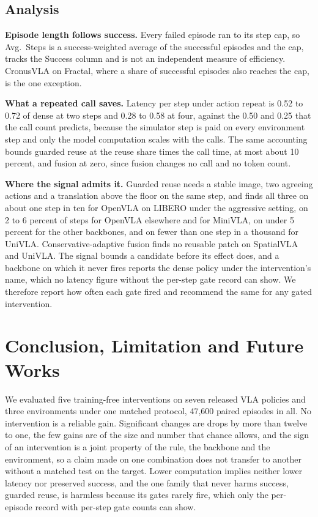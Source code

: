 \documentclass[letterpaper, 10 pt, conference]{ieeeconf}
\begin{document}
\subsection{Analysis}

\textbf{Episode length follows success.} Every failed episode ran to its
step cap, so Avg.\ Steps is a success-weighted average of the successful
episodes and the cap, tracks the Success column and is not an independent
measure of efficiency. CronusVLA on Fractal, where a share of successful
episodes also reaches the cap, is the one exception.

\textbf{What a repeated call saves.} Latency per step under action repeat
is 0.52 to 0.72 of dense at two steps and 0.28 to 0.58 at four, against
the 0.50 and 0.25 that the call count predicts, because the simulator step
is paid on every environment step and only the model computation scales
with the calls. The same accounting bounds guarded reuse at the reuse
share times the call time, at most about 10 percent, and fusion at zero,
since fusion changes no call and no token count.

\textbf{Where the signal admits it.} Guarded reuse needs a stable image,
two agreeing actions and a translation above the floor on the same step,
and finds all three on about one step in ten for OpenVLA on LIBERO under
the aggressive setting, on 2 to 6 percent of steps for OpenVLA elsewhere
and for MiniVLA, on under 5 percent for the other backbones, and on fewer
than one step in a thousand for UniVLA. Conservative-adaptive fusion finds
no reusable patch on SpatialVLA and UniVLA. The signal bounds a candidate
before its effect does, and a backbone on which it never fires reports the
dense policy under the intervention's name, which no latency figure
without the per-step gate record can show. We therefore report how often
each gate fired and recommend the same for any gated intervention.

\section{Conclusion, Limitation and Future Works}

We evaluated five training-free interventions on seven released VLA
policies and three environments under one matched protocol, 47,600 paired
episodes in all. No intervention is a reliable gain. Significant changes
are drops by more than twelve to one, the few gains are of the size and
number that chance allows, and the sign of an intervention is a joint
property of the rule, the backbone and the environment, so a claim made on
one combination does not transfer to another without a matched test on the
target. Lower computation implies neither lower latency nor preserved
success, and the one family that never harms success, guarded reuse, is
harmless because its gates rarely fire, which only the per-episode record
with per-step gate counts can show.
\end{document}
